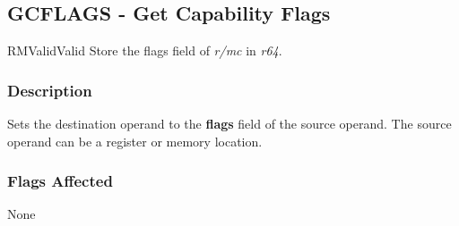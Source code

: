 \clearpage
{}
{}
\subsection*{GCFLAGS - Get Capability Flags}

\begin{x86opcodetable}
  {RM}{Valid}{Valid}
  {Store the flags field of \emph{r/mc} in \emph{r64}.}
\end{x86opcodetable}

\begin{x86opentable}
\end{x86opentable}

\subsubsection*{Description}

Sets the destination operand to the \textbf{flags} field of the source
operand.  The source operand can be a register or memory location.

\subsubsection*{Flags Affected}

None
